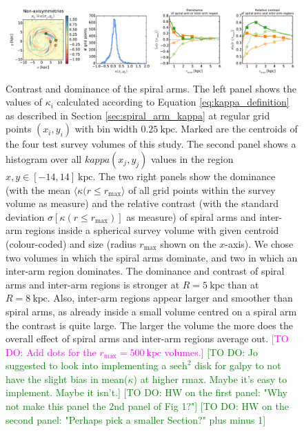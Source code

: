 \documentclass[iop,revtex4,numberedappendix,appendixfloats]{emulateapj}
\newcommand{\Wilma}[1]{\textcolor{Magenta}{#1}}
\newcommand{\HW}[1]{\textcolor{Green}{#1}}
\begin{document}
\begin{figure}[!htbp]
\centering
\includegraphics[width=\textwidth]{fig/whole_galaxy_kappa_i.pdf}
\caption{Contrast and dominance of the spiral arms. The left panel shows the values of $\kappa_i$ calculated according to Equation \ref{eq:kappa_definition} as described in Section \ref{sec:spiral_arm_kappa} at regular grid points $(x_i,y_i)$ with bin width $0.25~\text{kpc}$. Marked are the centroids of the four test survey volumes of this study. The second panel shows a histogram over all $kappa(x_j,y_j)$ values in the region $x,y \in [-14,14]~\text{kpc}$. The two right panels show the dominance (with the mean $\langle \kappa (r \leq r_\text{max} \rangle$ of all grid points within the survey volume as measure) and the relative contrast (with the standard deviation $\sigma[\kappa (r \leq r_\text{max})]$ as measure) of spiral arms and inter-arm regions inside a spherical survey volume with given centroid (colour-coded) and size (radius $r_\text{max}$ shown on the $x$-axis). We chose two volumes in which the spiral arms dominate, and two in which an inter-arm region dominates. The dominance and contrast of spiral arms and inter-arm regions is stronger at $R=5~\text{kpc}$ than at $R=8~\text{kpc}$. Also, inter-arm regions appear larger and smoother than spiral arms, as already inside a small volume centred on a spiral arm the contrast is quite large. The larger the volume the more does the overall effect of spiral arms and inter-arm regions average out. \Wilma{[TO DO: Add dots for the $r_\text{max}=500~\text{kpc}$ volumes.]} \HW{[TO DO: Jo suggested to look into implementing a $\text{sech}^2$ disk for galpy to not have the slight bias in mean($\kappa$) at higher rmax. Maybe it's easy to implement. Maybe it isn't.]} \HW{[TO DO: HW on the first panel: "Why not make this panel the 2nd panel of Fig 1?"]} \HW{[TO DO: HW on the second panel: "Perhaps pick a smaller Section?" plus minus 1]}}
\label{fig:spiral_arm_kappa}
\end{figure}


\end{document}
